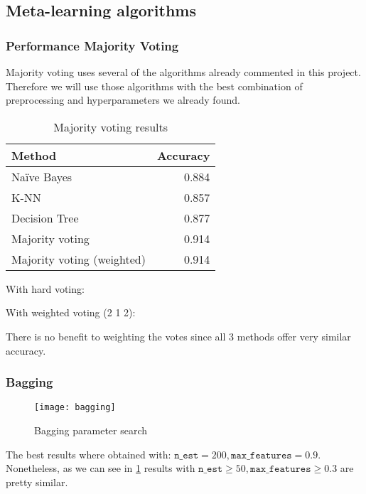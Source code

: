 
\subsection{Meta-learning algorithms}%
\label{sub:meta}

\subsubsection{Performance Majority Voting}

Majority voting uses several of the algorithms already commented in this project. Therefore we will use those algorithms with the best combination of preprocessing and hyperparameters we already found.

\begin{table}[H]
\centering
\caption{Majority voting results}
\begin{tabular}{lr}
\toprule
Method & Accuracy \\
\midrule
Na\"ive Bayes & 0.884 \\
K-NN & 0.857 \\
Decision Tree & 0.877 \\
\addlinespace[0.5em]
Majority voting & 0.914 \\
Majority voting (weighted)  & 0.914 \\
\bottomrule
\end{tabular}
\end{table}


With hard voting:

\noindent
With weighted voting (2 1 2):

There is no benefit to weighting the votes since all 3 methods offer very similar accuracy.
 
\pagebreak
\subsubsection{Bagging}

\begin{figure}[H]
\centering
\texttt{[image: bagging]}
\caption{Bagging parameter search}%
\label{fig:bagging}
\end{figure}

The best results where obtained with: $\texttt{n\_est} = 200, \texttt{max\_features} = 0.9$. Nonetheless, as we
can see in \cref{fig:bagging} results with $\texttt{n\_est} \geq 50, \texttt{max\_features} \geq 0.3$ are pretty
similar.

